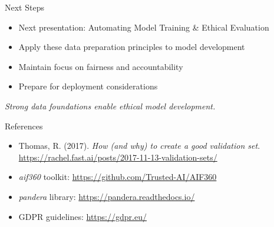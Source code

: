 \documentclass[aspectratio=169]{beamer}
\begin{document}

\begin{frame}{Next Steps}
\begin{itemize}
\item Next presentation: Automating Model Training \& Ethical Evaluation
\item Apply these data preparation principles to model development
\item Maintain focus on fairness and accountability
\item Prepare for deployment considerations
\end{itemize}

\emph{Strong data foundations enable ethical model development.}
\end{frame}


\begin{frame}{References}
\footnotesize
\begin{itemize}
\item Thomas, R. (2017). \textit{How (and why) to create a good validation set}. \url{https://rachel.fast.ai/posts/2017-11-13-validation-sets/}
\item \textit{aif360} toolkit: \url{https://github.com/Trusted-AI/AIF360}
\item \textit{pandera} library: \url{https://pandera.readthedocs.io/}
\item GDPR guidelines: \url{https://gdpr.eu/}
\end{itemize}
\end{frame}
\end{document}
